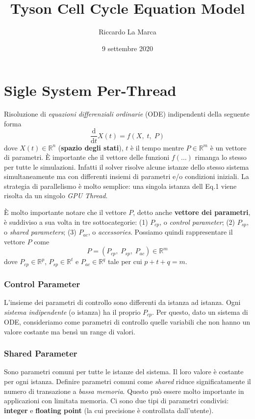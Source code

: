 \documentclass[11pt]{article}
\title{Tyson Cell Cycle Equation Model}
\author{Riccardo La Marca}
\date{9 settembre 2020}
\begin{document}
\maketitle
\tableofcontents
\section{Sigle System Per-Thread}
Risoluzione di \textit{equazioni differenziali ordinarie} (ODE) indipendenti della seguente forma
\begin{equation}
    \frac{\mathrm{d}}{\mathrm{d}t}X(t) = f(X,\;t,\;P)
\end{equation}
dove $X(t) \in \mathbb{R}^n$ (\textbf{spazio degli stati}), $t$ è il tempo mentre $P \in \mathbb{R}^m$ è un vettore di parametri. È importante che il vettore delle funzioni $f(\dots)$ rimanga lo stesso per tutte le simulazioni. Infatti il solver risolve alcune istanze dello stesso sistema simultaneamente ma con differenti insiemi di parametri e/o condizioni iniziali. La strategia di parallelismo è molto semplice: una singola istanza dell Eq.1 viene risolta da un singolo \textit{GPU Thread}.  

È molto importante notare che il vettore $P$, detto anche \textbf{vettore dei parametri}, è suddiviso a sua volta in tre sottocategorie: (1) \textbf{$P_{cp}$}, o \textit{control parameter}; (2) \textbf{$P_{sp}$}, o \textit{shared parameters}; (3) \textbf{$P_{ac}$}, o \textit{accessories}. Possiamo quindi rappresentare il vettore $P$ come 
\begin{equation*}
    P = (P_{cp},\;P_{sp},\;P_{ac}) \in \mathbb{R}^m
\end{equation*}
dove $P_{cp} \in \mathbb{R}^p$, $P_{sp} \in \mathbb{R}^t$ e $P_{ac} \in \mathbb{R}^q$ tale per cui $p + t + q = m$.
\subsubsection*{Control Parameter}
L'insieme dei parametri di controllo sono differenti da istanza ad istanza. Ogni \textit{sistema indipendente} (o istanza) ha il proprio $P_{cp}$. Per questo, dato un sistema di ODE, consideriamo come parametri di controllo quelle variabili che non hanno un valore costante ma bensì un range di valori.
\subsubsection*{Shared Parameter}
Sono parametri comuni per tutte le istanze del sistema. Il loro valore è costante per ogni istanza. Definire parametri comuni come \textit{shared} riduce significatamente il numero di transazione a \textit{bassa memoria}. Questo può essere molto importante in applicazioni con limitata memoria. Ci sono due tipi di parametri condivisi: \textbf{integer} e \textbf{floating point} (la cui precisione è controllata dall'utente).
\end{document}
